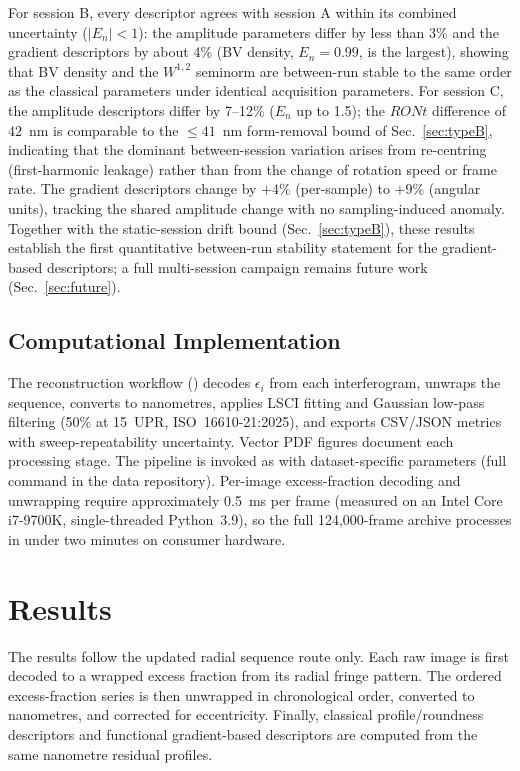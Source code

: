 \documentclass[review]{elsarticle}
\begin{document}
For session B, every descriptor agrees with session A within its combined uncertainty ($|E_n|<1$): the amplitude parameters differ by less than 3\% and the gradient descriptors by about 4\% (BV density, $E_n=0.99$, is the largest), showing that BV density and the $W^{1,2}$ seminorm are between-run stable to the same order as the classical parameters under identical acquisition parameters. For session C, the amplitude descriptors differ by 7--12\% ($E_n$ up to 1.5); the $RONt$ difference of $42$~nm is comparable to the $\leq41$~nm form-removal bound of Sec.~\ref{sec:typeB}, indicating that the dominant between-session variation arises from re-centring (first-harmonic leakage) rather than from the change of rotation speed or frame rate. The gradient descriptors change by $+4\%$ (per-sample) to $+9\%$ (angular units), tracking the shared amplitude change with no sampling-induced anomaly. Together with the static-session drift bound (Sec.~\ref{sec:typeB}), these results establish the first quantitative between-run stability statement for the gradient-based descriptors; a full multi-session campaign remains future work (Sec.~\ref{sec:future}).

\subsection{Computational Implementation}
The reconstruction workflow () decodes $\epsilon_i$ from each interferogram, unwraps the sequence, converts to nanometres, applies LSCI fitting and Gaussian low-pass filtering (50\% at 15~UPR, ISO~16610-21:2025), and exports CSV/JSON metrics with sweep-repeatability uncertainty. Vector PDF figures document each processing stage. The pipeline is invoked as  with dataset-specific parameters (full command in the data repository). Per-image excess-fraction decoding and unwrapping require approximately 0.5~ms per frame (measured on an Intel Core i7-9700K, single-threaded Python~3.9), so the full 124,000-frame archive processes in under two minutes on consumer hardware.

\section{Results}

The results follow the updated radial sequence route only. Each raw image is first decoded to a wrapped excess fraction from its radial fringe pattern. The ordered excess-fraction series is then unwrapped in chronological order, converted to nanometres, and corrected for eccentricity. Finally, classical profile/roundness descriptors and functional gradient-based descriptors are computed from the same nanometre residual profiles.
\end{document}
